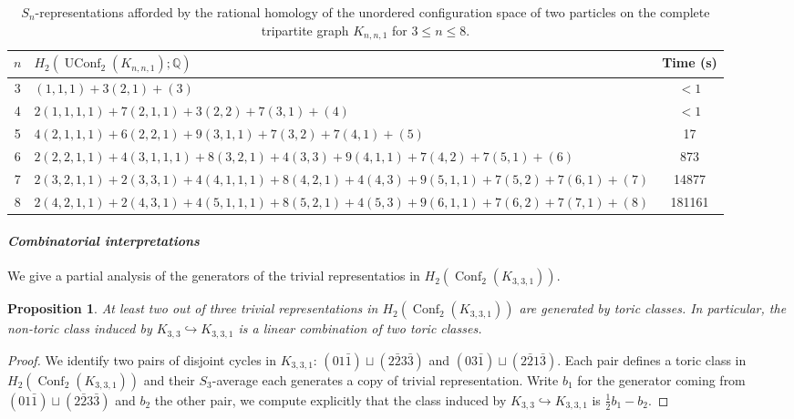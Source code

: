 \documentclass[12pt]{amsart}
\newtheorem{prop}[thm]{Proposition}
\theoremstyle{definition}
\newcommand{\Q}{\mathbb{Q}}
\newcommand{\conf}{\operatorname{Conf}}
\newcommand{\uconf}{\operatorname{UConf}}
\begin{document}
\begin{table}[th]
\caption{$S_n$-representations afforded by the rational homology of the unordered configuration space of two particles on the complete tripartite graph $K_{n,n,1}$ for $3\leq n\leq 8$.}
\label{table: H2tripartite unordered}
\begin{tabular}{@{}cp{}c@{}} \toprule
$n$ & $H_2(\uconf_2(K_{n,n,1});\Q)$ & Time (s) \\
\midrule
3  & $(1, 1, 1) + 3(2, 1) + (3)$ & $<1$ \\\midrule
4  & $2(1, 1, 1, 1) + 7(2, 1, 1) + 3(2, 2) + 7(3, 1) + (4)$ & $<1$ \\\midrule
5  & $4(2, 1, 1, 1) + 6(2, 2, 1) + 9(3, 1, 1) + 7(3, 2) + 7(4, 1) + (5)$ & 17 \\\midrule
6  & $2(2, 2, 1, 1) + 4(3, 1, 1, 1) + 8(3, 2, 1) + 4(3, 3) + 9(4, 1, 1) + 7(4, 2) + 7(5, 1) + (6)$ &
873  \\\midrule
7  & $2(3, 2, 1, 1) + 2(3, 3, 1) + 4(4, 1, 1, 1) + 8(4, 2, 1) + 4(4, 3) + 9(5, 1, 1) + 7(5, 2) + 7(6, 1) + (7)$  & 14877  \\\midrule
8 &  $2(4, 2, 1, 1) + 2(4, 3, 1) + 4(5, 1, 1, 1) + 8(5, 2, 1) + 4(5, 3) + 9(6, 1, 1) + 7(6, 2) + 7(7, 1) + (8)$ & 181161  \\
\bottomrule
\end{tabular}

\end{table}



\paragraph{\textit{Combinatorial interpretations}}
We give a partial analysis of the generators of the trivial representatios in $H_2(\conf_2(K_{3,3,1}))$.

\begin{prop}
    At least two out of three trivial representations in $H_2(\conf_2(K_{3,3,1}))$ are generated by toric classes. In particular, the non-toric class induced by $K_{3,3}\hookrightarrow K_{3,3,1}$ is a linear combination of two toric classes.
\end{prop}

\begin{proof}
    We identify two pairs of disjoint cycles in $K_{3,3,1}$: $(01\bar1) \sqcup (2\bar23\bar3)$ and $(03\bar1)\sqcup(2\bar21\bar3)$. Each pair defines a toric class in $H_2(\conf_2(K_{3,3,1}))$ and their $S_3$-average each generates a copy of trivial representation. Write $b_1$ for the generator coming from $(01\bar1) \sqcup (2\bar23\bar3)$ and $b_2$ the other pair, we compute explicitly that the class induced by $K_{3,3}\hookrightarrow K_{3,3,1}$ is $\frac{1}{2}b_1-b_2$.
\end{proof}
\end{document}
